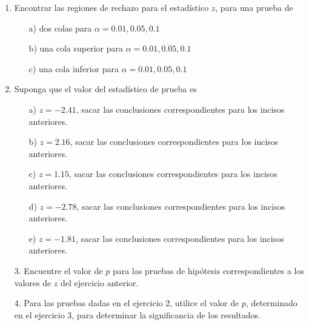\begin{frame}
\begin{frame}
\begin{center}
\end{center}




\begin{enumerate}
\item Encontrar las regiones de rechazo para el estad\'istico $z$, para una prueba de
\begin{itemize}
\item[a) ]  dos colas para $\alpha=0.01,0.05,0.1$
\item[b) ]  una cola superior para $\alpha=0.01,0.05,0.1$
\item[c) ] una cola inferior para $\alpha=0.01,0.05,0.1$

\end{itemize}


\item Suponga que el valor del estad\'istico de prueba es 
\begin{itemize}
\item[a) ]$z=-2.41$, sacar las conclusiones correspondientes para los incisos anteriores.
\item[b) ] $z=2.16$, sacar las conclusiones correspondientes para los incisos anteriores.
\item[c) ] $z=1.15$, sacar las conclusiones correspondientes para los incisos anteriores.
\item[d) ] $z=-2.78$, sacar las conclusiones correspondientes para los incisos anteriores.
\item[e) ] $z=-1.81$, sacar las conclusiones correspondientes para los incisos anteriores.

\end{itemize}
\end{enumerate}





\begin{itemize}
\item[3. ] Encuentre el valor de $p$ para las pruebas de hip\'otesis correspondientes a los valores de $z$ del ejercicio anterior.

\item[4. ] Para las pruebas dadas en el ejercicio 2, utilice el valor de $p$, determinado en el ejercicio 3,  para determinar la significancia de los resultados.


\end{itemize}



\end{frame}
\end{frame}
